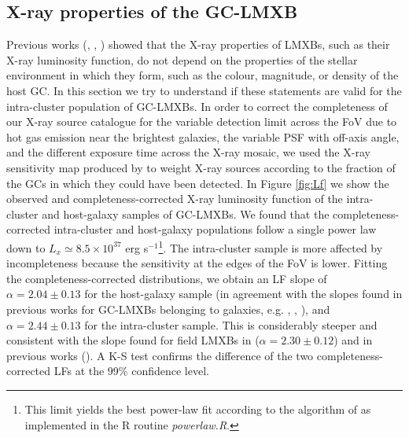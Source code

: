 \documentclass{aa}
\begin{document}
\subsection{X-ray properties of the GC-LMXB}
\label{sec:4.2}
Previous works (\citealt{Jordan2004}, \citealt{Kim2004}, \citealt{Paolillo2011}) showed that the X-ray properties of LMXBs, such as their X-ray luminosity function, do not depend on the properties of the stellar environment in which they form, such as the colour, magnitude, or density of the host GC. In this section we try to understand if these statements are valid for the intra-cluster population of GC-LMXBs. In order to correct the completeness of our X-ray source catalogue for the variable detection limit across the FoV due to hot gas emission near the brightest galaxies, the variable PSF with off-axis angle, and the different exposure time across the X-ray mosaic, we used the X-ray sensitivity map produced by \cite{Jin2019} to weight X-ray sources according to the fraction of the GCs in which they could have been detected. In Figure \ref{fig:Lf} we show the observed and completeness-corrected X-ray luminosity function of the intra-cluster and host-galaxy samples of GC-LMXBs. We found that the completeness-corrected intra-cluster and host-galaxy populations follow a single power law down to $L_x\simeq 8.5\times 10^{37}$ erg s$^{-1}$\footnote{This limit yields the best  power-law fit according to the algorithm of \cite{Newman2005} as implemented in the R routine {\it powerlaw.R}.}. The intra-cluster sample is more affected by incompleteness because the sensitivity at the edges of the FoV is lower. Fitting the completeness-corrected distributions, we obtain an LF slope of $\alpha=2.04\pm0.13$ for the host-galaxy sample (in agreement with the slopes found in previous works for GC-LMXBs belonging to galaxies, e.g.  \citealt{Kim2006}, \citealt{Paolillo2011}, \citealt{Jin2019}), and $\alpha=2.44\pm0.13$ for the intra-cluster sample. This is considerably steeper and consistent with the slope found for field LMXBs in \cite{Jin2019} ($\alpha=2.30\pm0.12$) and in previous works (\citealt{Paolillo2011}). A K-S test confirms the difference of the two completeness-corrected LFs at the 99\% confidence level. 
\end{document}
